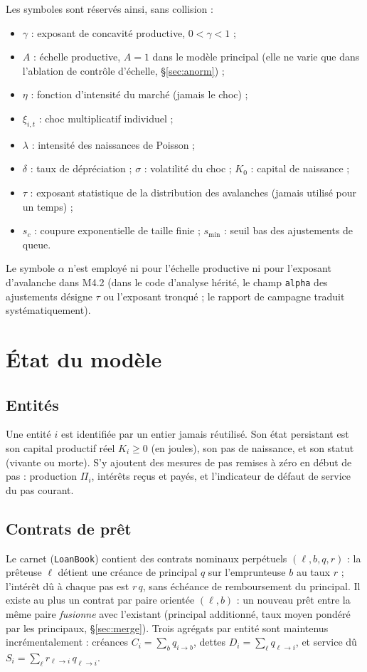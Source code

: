 \documentclass[11pt,a4paper]{article}
\newcommand{\code}[1]{\texttt{#1}}
\begin{document}
Les symboles sont réservés ainsi, sans collision :
\begin{itemize}
\item $\gamma$ : exposant de concavité productive, $0<\gamma<1$ ;
\item $A$ : échelle productive, $A=1$ dans le modèle principal (elle ne
      varie que dans l'ablation de contrôle d'échelle, §\ref{sec:anorm}) ;
\item $\eta$ : fonction d'intensité du marché (jamais le choc) ;
\item $\xi_{i,t}$ : choc multiplicatif individuel ;
\item $\lambda$ : intensité des naissances de Poisson ;
\item $\delta$ : taux de dépréciation ; $\sigma$ : volatilité du choc ;
      $K_0$ : capital de naissance ;
\item $\tau$ : exposant statistique de la distribution des avalanches
      (jamais utilisé pour un temps) ;
\item $s_c$ : coupure exponentielle de taille finie ; $s_{\min}$ : seuil
      bas des ajustements de queue.
\end{itemize}
Le symbole $\alpha$ n'est employé ni pour l'échelle productive ni pour
l'exposant d'avalanche dans M4.2 (dans le code d'analyse hérité, le champ
\code{alpha} des ajustements désigne $\tau$ ou l'exposant tronqué ; le
rapport de campagne traduit systématiquement).

\section{État du modèle}

\subsection{Entités}

Une entité $i$ est identifiée par un entier jamais réutilisé. Son état
persistant est son capital productif réel $K_i \ge 0$ (en joules), son pas
de naissance, et son statut (vivante ou morte). S'y ajoutent des mesures de
pas remises à zéro en début de pas : production $\Pi_i$, intérêts reçus et
payés, et l'indicateur de défaut de service du pas courant.

\subsection{Contrats de prêt}

Le carnet (\code{LoanBook}) contient des contrats nominaux perpétuels
$(\ell, b, q, r)$ : la prêteuse $\ell$ détient une créance de principal $q$
sur l'emprunteuse $b$ au taux $r$ ; l'intérêt dû à chaque pas est $r\,q$,
sans échéance de remboursement du principal. Il existe au plus un contrat
par paire orientée $(\ell,b)$ : un nouveau prêt entre la même paire
\emph{fusionne} avec l'existant (principal additionné, taux moyen pondéré
par les principaux, §\ref{sec:merge}). Trois agrégats par entité sont
maintenus incrémentalement : créances $C_i=\sum_{b} q_{i\to b}$, dettes
$D_i=\sum_{\ell} q_{\ell\to i}$, et service dû
$S_i=\sum_{\ell} r_{\ell\to i}\,q_{\ell\to i}$.
\end{document}
